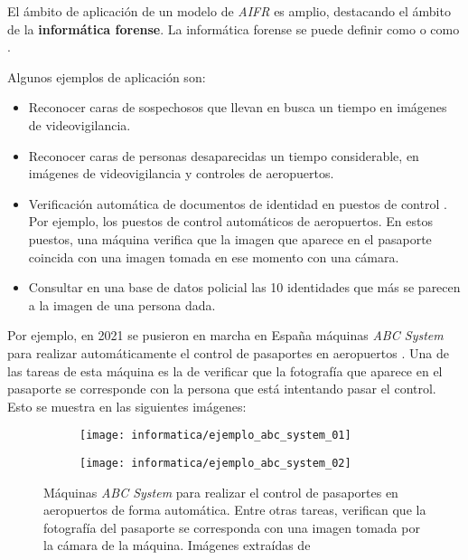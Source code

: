 El ámbito de aplicación de un modelo de \textit{AIFR} es amplio, destacando el ámbito de la \textbf{informática forense}. La informática forense se puede definir como  o como  \cite{informatica:libro_informatica_forense}.

Algunos ejemplos de aplicación son:

\begin{itemize}
	\item Reconocer caras de sospechosos que llevan en busca un tiempo en imágenes de videovigilancia.
	\item Reconocer caras de personas desaparecidas un tiempo considerable, en imágenes de videovigilancia y controles de aeropuertos.
	\item Verificación automática de documentos de identidad en puestos de control \cite{informatica:tecnica_sintesis_aifr}. Por ejemplo, los puestos de control automáticos de aeropuertos. En estos puestos, una máquina verifica que la imagen que aparece en el pasaporte coincida con una imagen tomada en ese momento con una cámara.
	\item Consultar en una base de datos policial las 10 identidades que más se parecen a la imagen de una persona dada.
\end{itemize}

Por ejemplo, en 2021 se pusieron en marcha en España máquinas \textit{ABC System} para realizar automáticamente el control de pasaportes en aeropuertos \cite{informatica:articulo_abc_system}. Una de las tareas de esta máquina es la de verificar que la fotografía que aparece en el pasaporte se corresponde con la persona que está intentando pasar el control. Esto se muestra en las siguientes imágenes:

\begin{figure}[H]
	\centering
	\begin{subfigure}{0.4\textwidth}
		\texttt{[image: informatica/ejemplo\_abc\_system\_01]}
	\end{subfigure}
	\begin{subfigure}{0.4\textwidth}
		\texttt{[image: informatica/ejemplo\_abc\_system\_02]}
	\end{subfigure}

	\caption{Máquinas \textit{ABC System} para realizar el control de pasaportes en aeropuertos de forma automática. Entre otras tareas, verifican que la fotografía del pasaporte se corresponda con una imagen tomada por la cámara de la máquina. Imágenes extraídas de \cite{informatica:articulo_abc_system}}
\end{figure}

